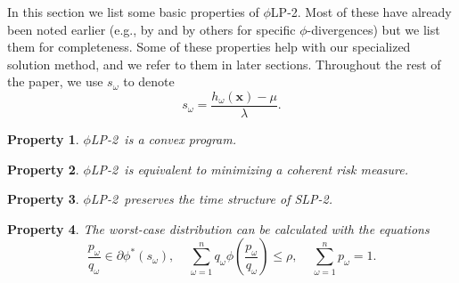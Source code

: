 \documentclass[opre,nonblindrev]{informs3} %
\newcommand{\x}{\mathbf{x}}
\newtheorem{property}{Property}
\newcommand{\plp}{$\phi$LP-2}
\begin{document}
In this section we list some basic properties of \plp.
Most of these have already been noted earlier (e.g., by \citet{bental2011robust} and by others for specific $\phi$-divergences) but we list them for completeness.
Some of these properties help with our specialized solution method, and we refer to them in later sections.
Throughout the rest of the paper, we use $s_\omega$ to denote
\begin{equation*}
	s_\omega = \frac{h_\omega(\x) - \mu}{\lambda}. %
\end{equation*}

\begin{property}
	\label{property:convex}
	\plp\ is a convex program.
\end{property}

\begin{property}
	\label{property:coherent_risk_measure}
	\plp\ is equivalent to minimizing a coherent risk measure.
\end{property}

\begin{property}
	\label{property:time_structure}
	\plp\ preserves the time structure of SLP-2.
\end{property}

\begin{property}
	\label{property:primal_dual_relation}
	The worst-case distribution can be calculated with the equations
	\begin{equation}\label{eq:p_worst}
		\frac{p_\omega}{q_\omega} \in \partial \phi^*\left(s_\omega\right), \ \ \ \ \ \sum_{\omega=1}^n q_\omega \phi\left(\frac{p_\omega}{q_\omega}\right) \leq \rho, \ \ \ \ \ \sum_{\omega=1}^n p_\omega = 1.
	\end{equation}		
\end{property}
\end{document}
